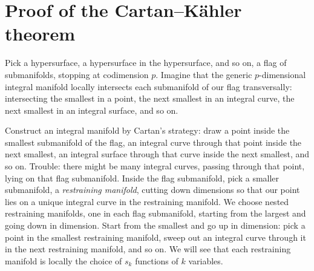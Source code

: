 \chapter{%
\texorpdfstring{Proof of the Cartan--K\"ahler theorem}%
{Proof of the Cartan--Kaehler theorem}%
}%
\label{chapter:proof}%
%
Pick a hypersurface, a hypersurface in the hypersurface, and so on, a flag of submanifolds, stopping at codimension \(p\).
Imagine that the generic \(p\)-dimensional integral manifold locally intersects each submanifold of our flag transversally: intersecting the smallest in a point, the next smallest in an integral curve, the next smallest in an integral surface, and so on.

Construct an integral manifold by Cartan's strategy: draw a point inside the smallest submanifold of the flag, an integral curve through that point inside the next smallest, an integral surface through that curve inside the next smallest, and so on.
Trouble: there might be many integral curves, passing through that point, lying on that flag submanifold.
Inside the flag submanifold, pick a smaller submanifold, a \emph{restraining manifold}, cutting down dimensions so that our point lies on a unique integral curve in the restraining manifold.
We choose nested restraining manifolds, one in each flag submanifold, starting from the largest and going down in dimension.
Start from the smallest and go up in dimension: pick a point in the smallest restraining manifold, sweep out an integral curve through it in the next restraining manifold, and so on.
We will see that each restraining manifold is locally the choice of \(s_k\) functions of \(k\) variables.

